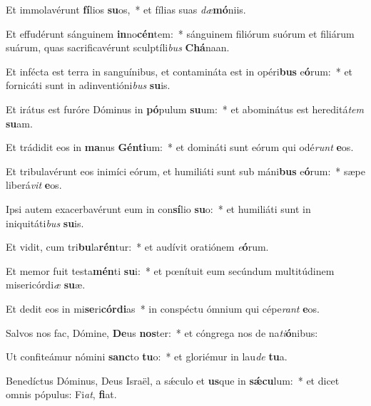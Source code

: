 \item Et immolavérunt \textbf{fí}lios \textbf{su}os,~* et fílias suas \textit{dæ}\textbf{mó}niis.
\item Et effudérunt sánguinem \textbf{in}no\textbf{cén}tem:~* sánguinem filiórum suórum et filiárum suárum, quas sacrificavérunt sculptíli\textit{bus} \textbf{Chá}naan.
\item Et infécta est terra in sanguínibus, et contamináta est in opéri\textbf{bus} e\textbf{ó}rum:~* et fornicáti sunt in adinventióni\textit{bus} \textbf{su}is.
\item Et irátus est furóre Dóminus in \textbf{pó}pulum \textbf{su}um:~* et abominátus est hereditá\textit{tem} \textbf{su}am.
\item Et trádidit eos in \textbf{ma}nus \textbf{Gén}\textbf{ti}um:~* et domináti sunt eórum qui odé\textit{runt} \textbf{e}os.
\item Et tribulavérunt eos inimíci eórum, et humiliáti sunt sub máni\textbf{bus} e\textbf{ó}rum:~* sæpe liberá\textit{vit} \textbf{e}os.
\item Ipsi autem exacerbavérunt eum in con\textbf{sí}lio \textbf{su}o:~* et humiliáti sunt in iniquitáti\textit{bus} \textbf{su}is.
\item Et vidit, cum tri\textbf{bu}la\textbf{rén}tur:~* et audívit oratiónem \textit{e}\textbf{ó}rum.
\item Et memor fuit testa\textbf{mén}ti \textbf{su}i:~* et pœnítuit eum secúndum multitúdinem misericórdi\textit{æ} \textbf{su}æ.
\item Et dedit eos in mi\textbf{se}ri\textbf{cór}\textbf{di}as~* in conspéctu ómnium qui cépe\textit{rant} \textbf{e}os.
\item Salvos nos fac, Dómine, \textbf{De}us \textbf{nos}ter:~* et cóngrega nos de na\textit{ti}\textbf{ó}nibus:
\item Ut confiteámur nómini \textbf{sanc}to \textbf{tu}o:~* et gloriémur in lau\textit{de} \textbf{tu}a.
\item Benedíctus Dóminus, Deus Israël, a sǽculo et \textbf{us}que in \textbf{sǽ}\textbf{cu}lum:~* et dicet omnis pópulus: Fi\textit{at}, \textbf{fi}at.
